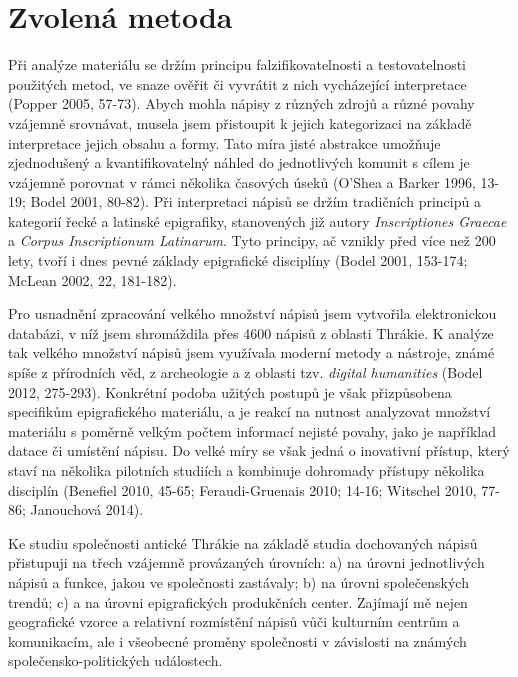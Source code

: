 
\section[zvolená-metoda]{Zvolená metoda}

Při analýze materiálu se držím principu falzifikovatelnosti a testovatelnosti použitých metod, ve snaze ověřit či vyvrátit z nich vycházející interpretace (Popper 2005, 57-73). Abych mohla nápisy z různých zdrojů a různé povahy vzájemně srovnávat, musela jsem přistoupit k jejich kategorizaci na základě interpretace jejich obsahu a formy. Tato míra jisté abstrakce umožňuje zjednodušený a kvantifikovatelný náhled do jednotlivých komunit s cílem je vzájemně porovnat v rámci několika časových úseků (O'Shea a Barker 1996, 13-19; Bodel 2001, 80-82). Při interpretaci nápisů se držím tradičních principů a kategorií řecké a latinské epigrafiky, stanovených již autory {\em Inscriptiones Graecae} a {\em Corpus Inscriptionum Latinarum}. Tyto principy, ač vznikly před více než 200 lety, tvoří i dnes pevné základy epigrafické disciplíny (Bodel 2001, 153-174; McLean 2002, 22, 181-182).

Pro usnadnění zpracování velkého množství nápisů jsem vytvořila elektronickou databázi, v níž jsem shromáždila přes 4600 nápisů z oblasti Thrákie. K analýze tak velkého množství nápisů jsem využívala moderní metody a nástroje, známé spíše z přírodních věd, z archeologie a z oblasti tzv. {\em digital humanities} (Bodel 2012, 275-293). Konkrétní podoba užitých postupů je však přizpůsobena specifikům epigrafického materiálu, a je reakcí na nutnost analyzovat množství materiálu s poměrně velkým počtem informací nejisté povahy, jako je například datace či umístění nápisu. Do velké míry se však jedná o inovativní přístup, který staví na několika pilotních studiích a kombinuje dohromady přístupy několika disciplín (Benefiel 2010, 45-65; Feraudi-Gruenais 2010; 14-16; Witschel 2010, 77-86; Janouchová 2014).

Ke studiu společnosti antické Thrákie na základě studia dochovaných nápisů přistupuji na třech vzájemně provázaných úrovních: a) na úrovni jednotlivých nápisů a funkce, jakou ve společnosti zastávaly; b) na úrovni společenských trendů; c) a na úrovni epigrafických produkčních center. Zajímají mě nejen geografické vzorce a relativní rozmístění nápisů vůči kulturním centrům a komunikacím, ale i všeobecné proměny společnosti v závislosti na známých společensko-politických událostech.

